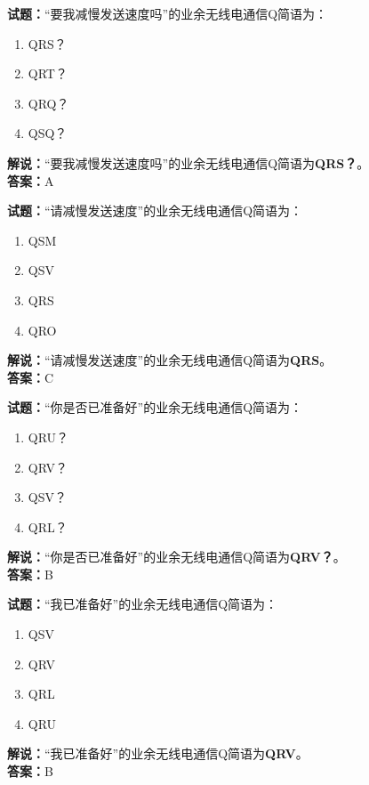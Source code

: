 \documentclass{ctexbook}
\begin{document}
\bigskip


\noindent\textbf{试题：}“要我减慢发送速度吗”的业余无线电通信Q简语为：
\begin{enumerate}[leftmargin=3em]
\item QRS？
\item QRT？
\item QRQ？
\item QSQ？
\end{enumerate}
\noindent\textbf{解说：}“要我减慢发送速度吗”的业余无线电通信Q简语为\textbf{QRS？}。\\\noindent\textbf{答案：}A




\bigskip


\noindent\textbf{试题：}“请减慢发送速度”的业余无线电通信Q简语为：
\begin{enumerate}[leftmargin=3em]
\item QSM
\item QSV
\item QRS
\item QRO
\end{enumerate}
\noindent\textbf{解说：}“请减慢发送速度”的业余无线电通信Q简语为\textbf{QRS}。\\\noindent\textbf{答案：}C




\bigskip


\noindent\textbf{试题：}“你是否已准备好”的业余无线电通信Q简语为：
\begin{enumerate}[leftmargin=3em]
\item QRU？
\item QRV？
\item QSV？
\item QRL？
\end{enumerate}
\noindent\textbf{解说：}“你是否已准备好”的业余无线电通信Q简语为\textbf{QRV？}。\\\noindent\textbf{答案：}B




\bigskip


\noindent\textbf{试题：}“我已准备好”的业余无线电通信Q简语为：
\begin{enumerate}[leftmargin=3em]
\item QSV
\item QRV
\item QRL
\item QRU
\end{enumerate}
\noindent\textbf{解说：}“我已准备好”的业余无线电通信Q简语为\textbf{QRV}。\\\noindent\textbf{答案：}B
\end{document}
